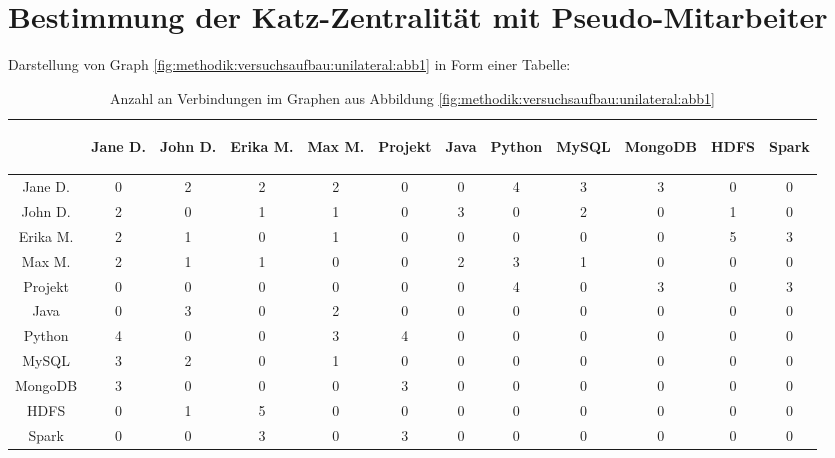 \section{Bestimmung der Katz-Zentralität mit Pseudo-Mitarbeiter}
\label{ch:nebenrechnungen:katzZentralitaetPseudoMitarbeiter}
Darstellung von Graph \ref{fig:methodik:versuchsaufbau:unilateral:abb1} in Form einer Tabelle:
\begin{table}[h]
	\centering
	\begin{tabular}{c|c|c|c|c|c|c|c|c|c|c|c}
		& \begin{sideways}Jane D.\end{sideways} & \begin{sideways}John D.\end{sideways} & \begin{sideways}Erika M.\end{sideways} & \begin{sideways}Max M.\end{sideways} & \begin{sideways}Projekt\end{sideways} & \begin{sideways}Java\end{sideways} & \begin{sideways}Python\end{sideways} & \begin{sideways}MySQL\end{sideways} & \begin{sideways}MongoDB\end{sideways} & \begin{sideways}HDFS\end{sideways} & \begin{sideways}Spark\end{sideways} \\
		\hline
		Jane D.  & 0 & 2 & 2 & 2 & 0 & 0 & 4 & 3 & 3 & 0 & 0\\
		John D.  & 2 & 0 & 1 & 1 & 0 & 3 & 0 & 2 & 0 & 1 & 0\\
		Erika M. & 2 & 1 & 0 & 1 & 0 & 0 & 0 & 0 & 0 & 5 & 3\\
		Max M.   & 2 & 1 & 1 & 0 & 0 & 2 & 3 & 1 & 0 & 0 & 0\\
		Projekt  & 0 & 0 & 0 & 0 & 0 & 0 & 4 & 0 & 3 & 0 & 3\\
		Java     & 0 & 3 & 0 & 2 & 0 & 0 & 0 & 0 & 0 & 0 & 0\\
		Python   & 4 & 0 & 0 & 3 & 4 & 0 & 0 & 0 & 0 & 0 & 0\\
		MySQL    & 3 & 2 & 0 & 1 & 0 & 0 & 0 & 0 & 0 & 0 & 0\\
		MongoDB  & 3 & 0 & 0 & 0 & 3 & 0 & 0 & 0 & 0 & 0 & 0\\
		HDFS     & 0 & 1 & 5 & 0 & 0 & 0 & 0 & 0 & 0 & 0 & 0\\
		Spark    & 0 & 0 & 3 & 0 & 3 & 0 & 0 & 0 & 0 & 0 & 0
	\end{tabular}
	\caption{Anzahl an Verbindungen im Graphen aus Abbildung \ref{fig:methodik:versuchsaufbau:unilateral:abb1}}
	\label{tbl:berechnungDerKatzZentralitaetPseudoMitarbeiter:tbl1}
\end{table}

